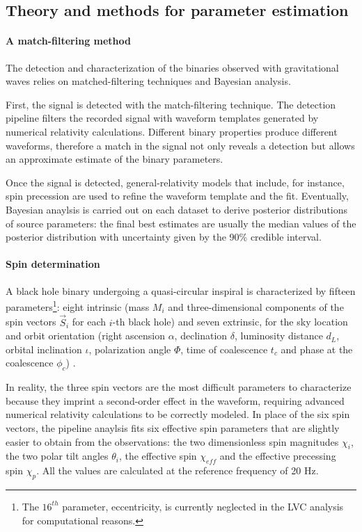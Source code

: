 \documentclass[a4paper,titlepage]{book}     	%
\begin{document}
\subsection{Theory and methods for parameter estimation}\label{subsec:GWtheorymethod}
\paragraph{A match-filtering method} The detection and characterization of the binaries observed with gravitational waves relies on matched-filtering techniques and Bayesian analysis. 

First, the signal is detected with the match-filtering technique. The detection pipeline filters the recorded signal with waveform templates generated by numerical relativity calculations. Different binary properties produce different waveforms, therefore a match in the signal not only reveals a detection but allows an approximate estimate of the binary parameters.

Once the signal is detected, general-relativity models that include, for instance, spin precession are used to refine the waveform template and the fit. Eventually, Bayesian anaylsis is carried out on each dataset to derive posterior distributions of source parameters: the final best estimates are usually the median values of the posterior distribution with uncertainty given by the 90\% credible interval.

\paragraph{Spin determination} A black hole binary undergoing a quasi-circular inspiral is characterized by fifteen parameters\footnote{The $16^{th}$ parameter, eccentricity, is currently neglected in the LVC analysis for computational reasons.}: eight intrinsic (mass $M_i$ and three-dimensional components of the spin vectors $\vec{S}_i$ for each $i$-th black hole) and seven extrinsic, for the sky location and orbit orientation (right ascension $\alpha$, declination $\delta$, luminosity distance $d_L$, orbital inclination $\iota$, polarization angle $\Phi$, time of coalescence $t_c$ and phase at the coalescence $\phi_c$) \cite{GWTC-1}.

In reality, the three spin vectors are the most difficult parameters to characterize because they imprint a second-order effect in the waveform, requiring advanced numerical relativity calculations to be correctly modeled. In place of the six spin vectors, the pipeline anaylsis fits six effective spin parameters that are slightly easier to obtain from the observations: the two dimensionless spin magnitudes $\chi_i$, the two polar tilt angles $\theta_i$, the effective spin $\chi_{eff}$ and the effective precessing spin $\chi_p$. All the values are calculated at the reference frequency of 20 Hz.
\end{document}
